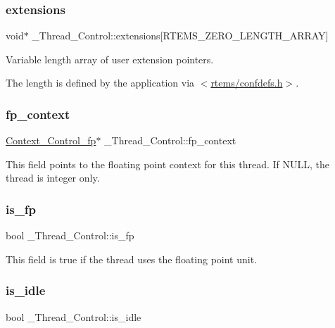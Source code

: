 \subsubsection{\texorpdfstring{extensions}{extensions}}
{\footnotesize\ttfamily void$\ast$ \+\_\+\+Thread\+\_\+\+Control\+::extensions\mbox{[}R\+T\+E\+M\+S\+\_\+\+Z\+E\+R\+O\+\_\+\+L\+E\+N\+G\+T\+H\+\_\+\+A\+R\+R\+AY\mbox{]}}



Variable length array of user extension pointers. 

The length is defined by the application via $<$\mbox{\hyperlink{confdefs_8h}{rtems/confdefs.\+h}}$>$. \mbox{\label{struct__Thread__Control_a3ade3a2297638311de958b5f82639c9d}} 
\subsubsection{\texorpdfstring{fp\_context}{fp\_context}}
{\footnotesize\ttfamily \mbox{\hyperlink{structContext__Control__fp}{Context\+\_\+\+Control\+\_\+fp}}$\ast$ \+\_\+\+Thread\+\_\+\+Control\+::fp\+\_\+context}

This field points to the floating point context for this thread. If N\+U\+LL, the thread is integer only. \mbox{\label{struct__Thread__Control_a5569ce8382eb7faa5dddcc58a8d3c262}} 
\subsubsection{\texorpdfstring{is\_fp}{is\_fp}}
{\footnotesize\ttfamily bool \+\_\+\+Thread\+\_\+\+Control\+::is\+\_\+fp}

This field is true if the thread uses the floating point unit. \mbox{\label{struct__Thread__Control_adc0e7170ef7f9cea626614d724526e19}} 
\subsubsection{\texorpdfstring{is\_idle}{is\_idle}}
{\footnotesize\ttfamily bool \+\_\+\+Thread\+\_\+\+Control\+::is\+\_\+idle}


